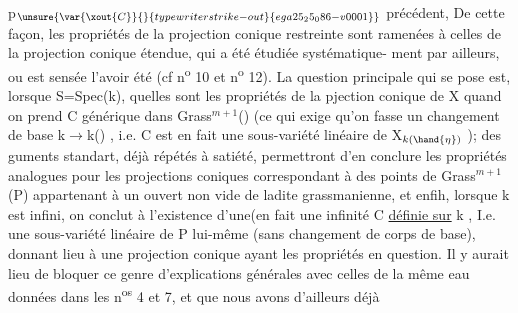
p$_{\unsure{\var{\xout{C}}{}{typewriter strike-out}{ega25_25_086-v0001}}}$ précédent, 
 De cette façon, les propriétés de
la projection conique  restreinte  sont ramenées  à
celles de la projection conique étendue, qui a été  étudiée systématique-%
ment par ailleurs, ou est sensée l'avoir été (cf n\textsuperscript{o} 10 et n\textsuperscript{o} 12). La
question principale qui se pose est, lorsque  S=Spec(k), quelles sont
les propriétés de la pjection conique  de X  quand on prend C générique
dans Grass$^{m+1}$() (ce qui exige  qu'on fasse un changement de base
k$\rightarrow$k() , i.e.  C est  en fait une sous-variété linéaire de X$_{k(\hand{\eta})}$ ); des
guments  standart, déjà répétés à satiété, permettront d'en conclure
les propriétés analogues pour les projections coniques correspondant à 
des points de Grass$^{m+1}$(P)  appartenant à un ouvert non vide de ladite
grassmanienne, et enfih, lorsque k est infini, on conclut à l'existence
d'une(en fait une infinité\hand{)}   C  \uline{définie sur} k , I.e.  une sous-variété
linéaire de P lui-même (sans changement de corps de base), donnant lieu
à une projection conique ayant les propriétés en question. Il y aurait
 lieu de bloquer ce genre d'explications générales avec celles de la même
 eau données dans les n\textsuperscript{os} 4 et 7, et que nous avons d'ailleurs déjà
